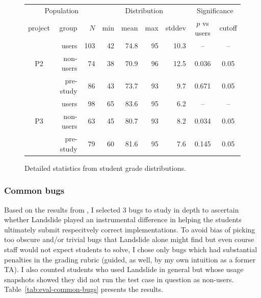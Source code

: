 \begin{figure}[t]
	\begin{center}
		\small
	\begin{tabular}{cr|r||r|r|r|r||cc}
		\multicolumn{3}{c||}{Population} & \multicolumn{4}{c||}{Distribution} & \multicolumn{2}{c}{Significance} \\
		project	& group		& $N$	& min	& mean	& max	& stddev & $p$ vs users	& cutoff\\
		\hline
			& users		& 103	& 42	& 74.8	& 95	& 10.3	& --	& --	\\
		P2	& non-users	& 74	& 38	& 70.9	& 96	& 12.5	& 0.036	& 0.05	\\
			& pre-study	& 86	& 43	& 73.7	& 93	& 9.7	& 0.671	& 0.05	\\
			\hline
			& users		& 98	& 65	& 83.6	& 95	& 6.2	& --	& --	\\
		P3	& non-users	& 63	& 45	& 80.7	& 93	& 8.2	& 0.034	& 0.05	\\
			& pre-study	& 79	& 60	& 81.6	& 95	& 7.6	& 0.145	& 0.05	\\
	\end{tabular}
	\end{center}
	\caption{Detailed statistics from student grade distributions.}
	\label{tab:table-of-ze-studence}
\end{figure}

\subsubsection{Common bugs}

Based on the results from \sect{\ref{sec:education-eval-bugfinding}},
I selected 3 bugs to study in depth to ascertain
whether Landslide played an instrumental difference
in helping the students ultimately submit respecitvely correct implementations.
To avoid bias of picking too obscure and/or trivial bugs
that Landslide alone might find but even course staff would not expect students to solve,
I chose only bugs which had substantial penalties in the grading rubric
(guided, as well, by my own intuition as a former TA).
I also counted students who used Landslide in general but whose usage snapshots showed they did not run the test case in question as non-users.
Table~\ref{tab:eval-common-bugs} presents the results.

